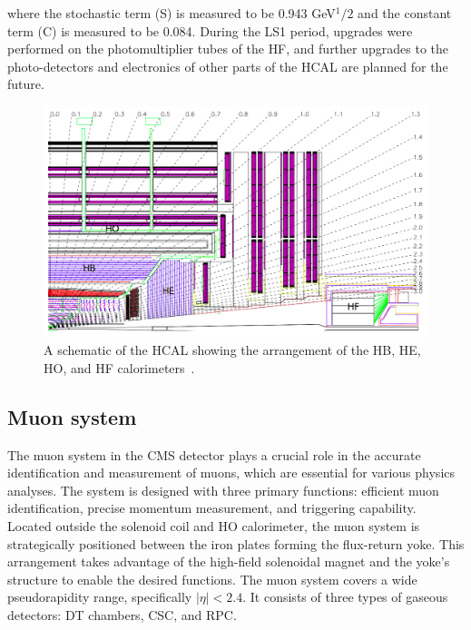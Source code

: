 where the stochastic term (S) is measured to be 0.943 GeV${^1/2}$ and the constant term (C) is measured to be 0.084.
During the \ac{LS1} period, upgrades were performed on the photomultiplier tubes of the \ac{HF}, and further upgrades to the photo-detectors and electronics of other parts of the \ac{HCAL} are planned for the future.

\begin{figure}[!hbtp]
    \centering
    \includegraphics[width=\textwidth]{Figures/HCAL.png}
    \caption{A schematic of the \ac{HCAL} showing the arrangement of the \ac{HB}, \ac{HE}, \ac{HO}, and \ac{HF} calorimeters~\cite{CMS_Setup}.}
    \label{fig:hcal}
\end{figure}

\subsection{Muon system}

The muon system in the \ac{CMS} detector plays a crucial role in the accurate identification and measurement of muons, which are essential for various physics analyses. 
The system is designed with three primary functions: efficient muon identification, precise momentum measurement, and triggering capability. \\

Located outside the solenoid coil and HO calorimeter, the muon system is strategically positioned between the iron plates forming the flux-return yoke. 
This arrangement takes advantage of the high-field solenoidal magnet and the yoke's structure to enable the desired functions.
The muon system covers a wide pseudorapidity range, specifically $|\eta| < 2.4$. 
It consists of three types of gaseous detectors: \ac{DT} chambers, \ac{CSC}, and \ac{RPC}. \\


